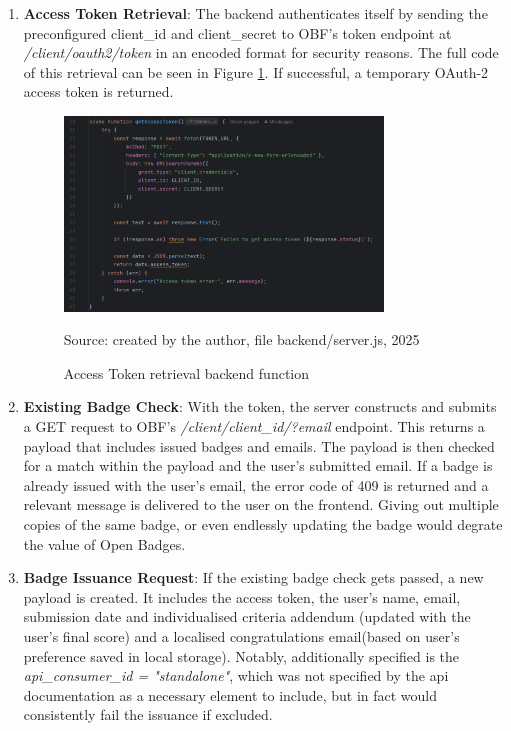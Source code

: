 \begin{enumerate}
\item \textbf{Access Token Retrieval}: The backend authenticates itself by sending the preconfigured client\_id and client\_secret to OBF’s token endpoint at \textit{/client/oauth2/token} in an encoded format for security reasons. The full code of this retrieval can be seen in Figure \ref{fig:get_token}. 
If successful, a temporary OAuth-2 access token is returned. 
\begin{figure}[hbtp]
\centering
\includegraphics[width=0.8\textwidth]{Media/get_token.png}
\caption{Access Token retrieval backend function}
\label{fig:get_token}
{\raggedright \small{Source: created by the author, file backend/server.js, 2025}\par}
\end{figure}
\item \textbf{Existing Badge Check}: With the token, the server constructs and submits a GET request to OBF’s \textit{/client/client\_id/?email} endpoint. 
This returns a payload that includes issued badges and emails. 
The payload is then checked for a match within the payload and the user's submitted email. 
If a badge is already issued with the user's email, the error code of 409 is returned and a relevant message is delivered to the user on the frontend. 
Giving out multiple copies of the same badge, or even endlessly updating the badge would degrate the value of Open Badges. 
\item \textbf{Badge Issuance Request}: If the existing badge check gets passed, a new payload is created. 
It includes the access token, the user's name, email, submission date and individualised criteria addendum (updated with the user's final score) and a localised congratulations email(based on user's preference saved in local storage). 
Notably, additionally specified is the \textit{api\_consumer\_id = "standalone"}, which was not specified by the \acrshort{api} documentation as a necessary element to include, but in fact would consistently fail the issuance if excluded. 

\end{enumerate}
